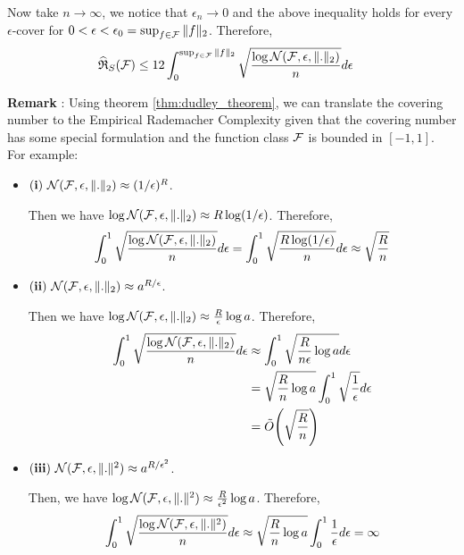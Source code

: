\begin{proof*}
    \noindent Now take $n\to\infty$, we notice that $\epsilon_n\to0$ and the above inequality holds for every $\epsilon$-cover for $0<\epsilon<\epsilon_0=\sup_{f\in\mathcal{F}}\|f\|_2$. Therefore,
    \begin{align*}
        \widehat{\mathfrak{R}}_S(\mathcal{F}) &\le 12 \int_{0}^{\sup_{f\in\mathcal{F}}\|f\|_2} \sqrt{
            \frac{\log\mathcal{N}(\mathcal{F}, \epsilon, \|.\|_2)}{n}
        }d\epsilon
    \end{align*}
\end{proof*}

\noindent\newline\textbf{Remark} : Using theorem \ref{thm:dudley_theorem}, we can translate the covering number to the Empirical Rademacher Complexity given that the covering number has some special formulation and the function class $\mathcal{F}$ is bounded in $[-1, 1]$. For example:
\begin{itemize}
    \item ${\bf (i)} \ \mathcal{N}(\mathcal{F}, \epsilon, \|.\|_2) \approx (1/\epsilon)^R$.

    \noindent Then we have $\log\mathcal{N}(\mathcal{F}, \epsilon, \|.\|_2) \approx R\log(1/\epsilon)$. Therefore,
    \begin{align*}
        \int_0^1 \sqrt{
            \frac{\log \mathcal{N}(\mathcal{F}, \epsilon, \|.\|_2)}{n}
        }d\epsilon = \int_0^1\sqrt{
            \frac{R\log(1/\epsilon)}{n}
        }d\epsilon \approx \sqrt{\frac{R}{n}}
    \end{align*}

    \item ${\bf (ii)} \ \mathcal{N}(\mathcal{F}, \epsilon, \|.\|_2) \approx a^{R/\epsilon}$.

    \noindent Then we have $\log\mathcal{N}(\mathcal{F}, \epsilon, \|.\|_2) \approx \frac{R}{\epsilon}\log a$. Therefore,
    \begin{align*}
        \int_0^1 \sqrt{
            \frac{\log \mathcal{N}(\mathcal{F}, \epsilon, \|.\|_2)}{n}
        }d\epsilon &\approx \int_0^1\sqrt{
            \frac{R}{n\epsilon}\log a 
        }d\epsilon \\
        &= \sqrt{
            \frac{R}{n}\log a 
        }\int_0^1 \sqrt{\frac{1}{\epsilon}}d\epsilon \\
        &= \tilde O\Bigg(  \sqrt{\frac{R}{n}}  \Bigg)
    \end{align*}

    \item ${\bf (iii)} \ \mathcal{N}(\mathcal{F}, \epsilon, \|.\|^2) \approx a^{R/\epsilon^2}$.
    
    \noindent Then, we have $\log \mathcal{N}(\mathcal{F}, \epsilon, \|.\|^2)\approx \frac{R}{\epsilon^2}\log a$. Therefore,
    \begin{align*}
        \int_0^1 \sqrt{
            \frac{\log \mathcal{N}(\mathcal{F}, \epsilon, \|.\|^2)}{n}
        }d\epsilon \approx \sqrt{
            \frac{R}{n}\log a 
        }\int_0^1 \frac{1}{\epsilon}d\epsilon = \infty
    \end{align*}
\end{itemize}


